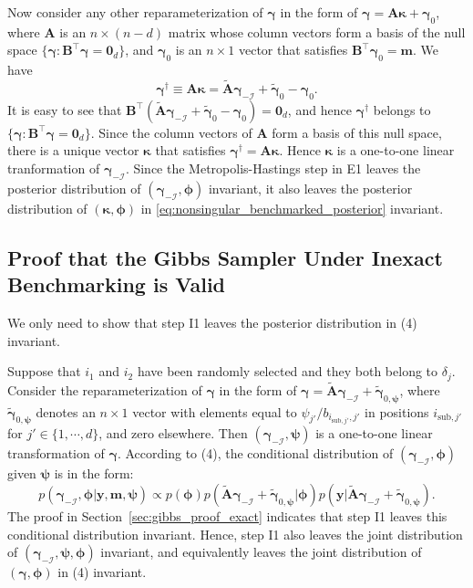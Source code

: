\documentclass[12pt]{article}
\begin{document}
Now consider any other reparameterization of $\bm{\gamma}$ in the form of $\bm{\gamma}=\bm{A}\bm{\kappa}+\bm{\gamma}_0$, where $\bm{A}$ is an $n\times (n-d)$ matrix whose column vectors form a basis of the null space $\{\bm{\gamma}:\bm{B}^{\top}\bm{\gamma}=\bm{0}_d\}$, and $\bm{\gamma}_0$ is an $n\times 1$ vector that satisfies $\bm{B}^{\top}\bm{\gamma}_0=\bm{m}$.  We have
\begin{equation}\label{eq:equiv_transform}
\bm{\gamma}^{\dag}\equiv\bm{A}\bm{\kappa}=\widetilde{\bm{A}}\bm{\gamma}_{-\mathcal{I}}+\widetilde{\bm{\gamma}}_0-\bm{\gamma}_0.
\end{equation}
It is easy to see that $\bm{B}^{\top}(\widetilde{\bm{A}}\bm{\gamma}_{-\mathcal{I}}+\widetilde{\bm{\gamma}}_0-\bm{\gamma}_0)=\bm{0}_d$, and hence $\bm{\gamma}^{\dag}$ belongs to $\{\bm{\gamma}:\bm{B}^{\top}\bm{\gamma}=\bm{0}_d\}$.  Since the column vectors of $\bm{A}$ form a basis of this null space, there is a unique vector $\bm{\kappa}$ that satisfies $\bm{\gamma}^{\dag}=\bm{A}\bm{\kappa}$. Hence $\bm{\kappa}$ is a one-to-one linear tranformation of $\bm{\gamma}_{-\mathcal{I}}$.  Since the Metropolis-Hastings step in E1 leaves the posterior distribution of $(\bm{\gamma}_{-\mathcal{I}},\bm{\phi})$ invariant, it also leaves the posterior distribution of $(\bm{\kappa},\bm{\phi})$ in \eqref{eq:nonsingular_benchmarked_posterior} invariant.

\subsection{Proof that the Gibbs Sampler Under Inexact Benchmarking is Valid}\label{sec:gibbs_proof_inexact}

We only need to show that step I1 leaves the posterior distribution in (4) invariant.

Suppose that $i_1$ and $i_2$ have been randomly selected and they both belong to $\delta_j$.
Consider the reparameterization of $\bm{\gamma}$ in the form of $\bm{\gamma}=\widetilde{\bm{A}}\bm{\gamma}_{-\mathcal{I}}+\widetilde{\bm{\gamma}}_{0,\bm{\psi}}$, where $\widetilde{\bm{\gamma}}_{0,\bm{\psi}}$ denotes an $n\times 1$ vector with elements equal to $\psi_{j'}/b_{i_{\text{sub},j'},j'}$ in positions $i_{\text{sub},j'}$ for $j'\in \{1,\cdots,d\}$, and zero elsewhere.  Then $(\bm{\gamma}_{-\mathcal{I}},\bm{\psi})$ is a one-to-one linear transformation of $\bm{\gamma}$.  According to (4), the conditional distribution of $(\bm{\gamma}_{-\mathcal{I}},\bm{\phi})$ given $\bm{\psi}$ is in the form:
\begin{equation*}
p(\bm{\gamma}_{-\mathcal{I}},\bm{\phi}|\bm{y},\bm{m},\bm{\psi})\propto p(\bm{\phi})p(\widetilde{\bm{A}}\bm{\gamma}_{-\mathcal{I}}+\widetilde{\bm{\gamma}}_{0,\bm{\psi}}|\bm{\phi})
p(\bm{y}|\widetilde{\bm{A}}\bm{\gamma}_{-\mathcal{I}}+\widetilde{\bm{\gamma}}_{0,\bm{\psi}}).
\end{equation*}
The proof in Section~\ref{sec:gibbs_proof_exact} indicates that step I1 leaves this conditional distribution invariant.  Hence, step I1 also leaves the joint distribution of $(\bm{\gamma}_{-\mathcal{I}},\bm{\psi},\bm{\phi})$ invariant, and equivalently leaves the joint distribution of $(\bm{\gamma},\bm{\phi})$ in (4) invariant.
\end{document}
